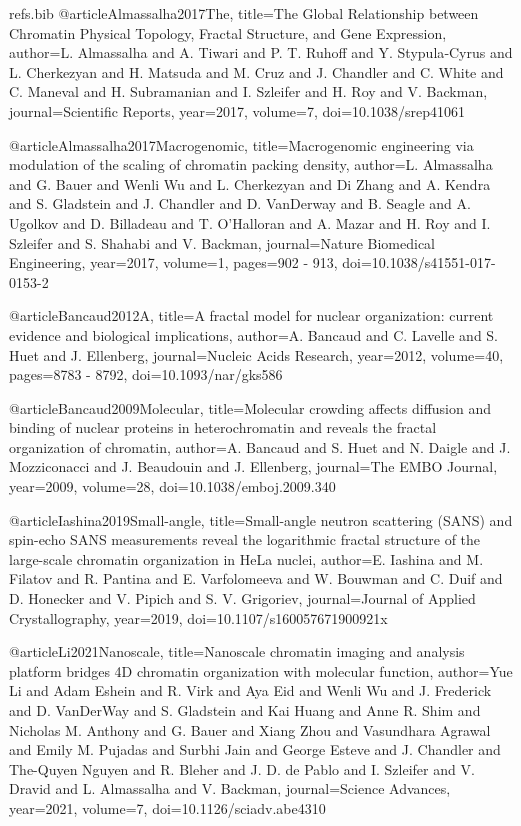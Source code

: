 \begin{filecontents}{refs.bib}
@article{Almassalha2017The,
title={The Global Relationship between Chromatin Physical Topology, Fractal Structure, and Gene Expression},
author={L. Almassalha and A. Tiwari and P. T. Ruhoff and Y. Stypula‐Cyrus and L. Cherkezyan and H. Matsuda and M. Cruz and J. Chandler and C. White and C. Maneval and H. Subramanian and I. Szleifer and H. Roy and V. Backman},
journal={Scientific Reports},
year={2017},
volume={7},
doi={10.1038/srep41061}
}

@article{Almassalha2017Macrogenomic,
title={Macrogenomic engineering via modulation of the scaling of chromatin packing density},
author={L. Almassalha and G. Bauer and Wenli Wu and L. Cherkezyan and Di Zhang and A. Kendra and S. Gladstein and J. Chandler and D. VanDerway and B. Seagle and A. Ugolkov and D. Billadeau and T. O'Halloran and A. Mazar and H. Roy and I. Szleifer and S. Shahabi and V. Backman},
journal={Nature Biomedical Engineering},
year={2017},
volume={1},
pages={902 - 913},
doi={10.1038/s41551-017-0153-2}
}

@article{Bancaud2012A,
title={A fractal model for nuclear organization: current evidence and biological implications},
author={A. Bancaud and C. Lavelle and S. Huet and J. Ellenberg},
journal={Nucleic Acids Research},
year={2012},
volume={40},
pages={8783 - 8792},
doi={10.1093/nar/gks586}
}

@article{Bancaud2009Molecular,
title={Molecular crowding affects diffusion and binding of nuclear proteins in heterochromatin and reveals the fractal organization of chromatin},
author={A. Bancaud and S. Huet and N. Daigle and J. Mozziconacci and J. Beaudouin and J. Ellenberg},
journal={The EMBO Journal},
year={2009},
volume={28},
doi={10.1038/emboj.2009.340}
}

@article{Iashina2019Small-angle,
title={Small-angle neutron scattering (SANS) and spin-echo SANS measurements reveal the logarithmic fractal structure of the large-scale chromatin organization in HeLa nuclei},
author={E. Iashina and M. Filatov and R. Pantina and E. Varfolomeeva and W. Bouwman and C. Duif and D. Honecker and V. Pipich and S. V. Grigoriev},
journal={Journal of Applied Crystallography},
year={2019},
doi={10.1107/s160057671900921x}
}

@article{Li2021Nanoscale,
title={Nanoscale chromatin imaging and analysis platform bridges 4D chromatin organization with molecular function},
author={Yue Li and Adam Eshein and R. Virk and Aya Eid and Wenli Wu and J. Frederick and D. VanDerWay and S. Gladstein and Kai Huang and Anne R. Shim and Nicholas M. Anthony and G. Bauer and Xiang Zhou and Vasundhara Agrawal and Emily M. Pujadas and Surbhi Jain and George Esteve and J. Chandler and The-Quyen Nguyen and R. Bleher and J. D. de Pablo and I. Szleifer and V. Dravid and L. Almassalha and V. Backman},
journal={Science Advances},
year={2021},
volume={7},
doi={10.1126/sciadv.abe4310}
}


\end{filecontents}

